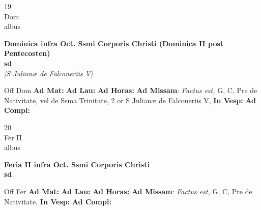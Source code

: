 \documentclass[10pt, openany]{book}
\begin{document}
        \begin{center}
            \begin{minipage}{3.5in}
                \vspace{2em}
                \begin{minipage}{0.5in}
                    {\Huge 19} \\
                    {\normalsize Dom} \\
                    {\normalsize albus}
                \end{minipage}
                \begin{minipage}{3.0in}
                    \textbf{ \large Dominica infra Oct. Ssmi Corporis Christi (Dominica II post Pentecosten) \\
                    \textnormal{\normalsize sd}} \\ \textit{[S Julianæ de Falconeriis V]} \\ 
                \end{minipage}
                \begin{justify}Off Dom
                    \textbf{Ad Mat: }
                    \textbf{Ad Lau: }
                    \textbf{Ad Horas: }\textbf{Ad Missam}: \textit{Factus est,} G, C, Pre de Nativitate, vel de Ssma Trinitate, 2 or S Julianæ de Falconeriis V,  
                    \textbf{In Vesp: }
                    \textbf{Ad Compl: }
                \end{justify}
            \end{minipage}
        \end{center}
    
        \begin{center}
            \begin{minipage}{3.5in}
                \vspace{2em}
                \begin{minipage}{0.5in}
                    {\Huge 20} \\
                    {\normalsize Fer II} \\
                    {\normalsize albus}
                \end{minipage}
                \begin{minipage}{3.0in}
                    \textbf{ \large Feria II infra Oct. Ssmi Corporis Christi \\
                    \textnormal{\normalsize sd}} \\ 
                \end{minipage}
                \begin{justify}Off Fer
                    \textbf{Ad Mat: }
                    \textbf{Ad Lau: }
                    \textbf{Ad Horas: }\textbf{Ad Missam}: \textit{Factus est,} G, C, Pre de Nativitate,  
                    \textbf{In Vesp: }
                    \textbf{Ad Compl: }
                \end{justify}
            \end{minipage}
        \end{center}
    
\end{document}
